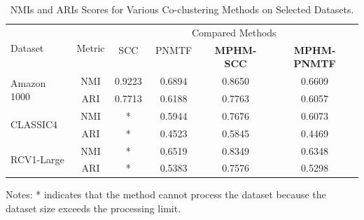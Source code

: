 \documentclass[journal]{IEEEtran}
\renewcommand{\cite}[1]{~\autocite{#1}}
\begin{document}
\begin{table}[htbp]
  \centering
  \caption{NMIs and ARIs Scores for Various Co-clustering Methods on Selected Datasets.}
  \label{tab:evaluation-metrics}
  \begin{tabular}{@{} l c cccc @{}}
    \toprule
    \multirow{2}{*}{Dataset}     & \multirow{2}{*}{Metric} & \multicolumn{4}{c}{Compared Methods}                                                                                                        \\
    \cmidrule{3-6}
                                 &                         & SCC \cite{dhillon2001CoclusteringDocumentsWords} & PNMTF \cite{chen2023ParallelNonNegativeMatrix} & \textbf{MPHM-SCC} & \textbf{MPHM-PNMTF} \\
    \midrule
    \multirow{2}{*}{Amazon 1000} & NMI                     & 0.9223                                           & 0.6894                                         & 0.8650            & 0.6609              \\
                                 & ARI                     & 0.7713                                           & 0.6188                                         & 0.7763            & 0.6057              \\
    \multirow{2}{*}{CLASSIC4}    & NMI                     & *                                                & 0.5944                                         & 0.7676            & 0.6073              \\
                                 & ARI                     & *                                                & 0.4523                                         & 0.5845            & 0.4469              \\
    \multirow{2}{*}{RCV1-Large}  & NMI                     & *                                                & 0.6519                                         & 0.8349            & 0.6348              \\
                                 & ARI                     & *                                                & 0.5383                                         & 0.7576            & 0.5298              \\
    \bottomrule
  \end{tabular}
  \begin{tablenotes}
    \small
    \item Notes: * indicates that the method cannot process the dataset because the dataset size exceeds the processing limit.
  \end{tablenotes}
\end{table}
\end{document}
